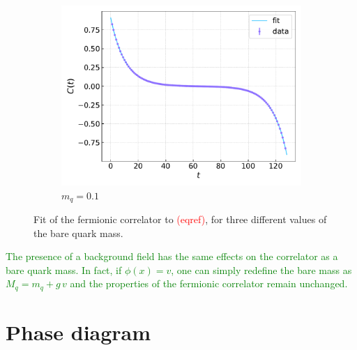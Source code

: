 \begin{figure}
\begin{subfigure}[b]{0.68\textwidth}
        \includegraphics[width=1.05\textwidth]{figures/correlator/corrs_free/corr_medium.pdf}
        \caption{$m_q = 0.1$}        
    \end{subfigure}
    \caption[Fit of the correlator for free Wilson fermions.]{Fit of the fermionic correlator to \textcolor{red}{(eqref)}, for three different values of the bare quark mass.}
    \label{fig:fit_wilson}
\end{figure}
\textcolor{green}{The presence of a background field has the same effects on the correlator as a bare quark mass. In fact, if $\phi(x) = v$, one can simply redefine the bare mass as $M_q = m_q + g \, v$ and the properties of the fermionic correlator remain unchanged.}
\newpage

\section{Phase diagram}

